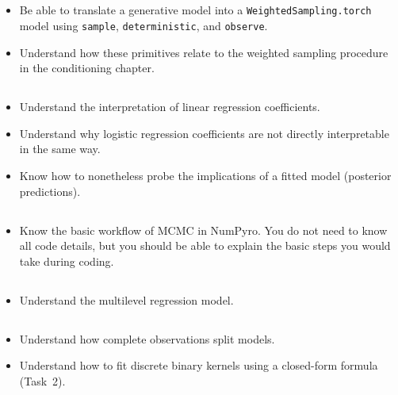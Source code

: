 \documentclass[11pt, a4paper]{article}
\begin{document}
\subsection{}

\begin{itemize}
  \item Be able to translate a generative model into a \texttt{WeightedSampling.torch} model using \texttt{sample}, \texttt{deterministic}, and \texttt{observe}.
  \item Understand how these primitives relate to the weighted sampling procedure in the conditioning chapter.
\end{itemize}

\subsection{}

\begin{itemize}
  \item Understand the interpretation of linear regression coefficients.
  \item Understand why logistic regression coefficients are not directly interpretable in the same way.
  \item Know how to nonetheless probe the implications of a fitted model (posterior predictions).
\end{itemize}

\subsection{}

\begin{itemize}
  \item Know the basic workflow of MCMC in NumPyro. You do not need to know all code details, but you should be able to explain the basic steps you would take during coding.
\end{itemize}

\subsection{}

\begin{itemize}
  \item Understand the multilevel regression model.
\end{itemize}

\subsection{}

\begin{itemize}
  \item Understand how complete observations split models.
  \item Understand how to fit discrete binary kernels using a closed-form formula (Task~2).
\end{itemize}
\end{document}

